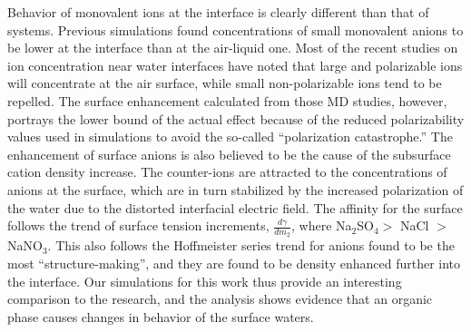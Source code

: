 Behavior of monovalent ions at the \ctcwat interface is clearly different than that of \airwat systems. Previous simulations found concentrations of small monovalent anions to be lower at the \ctcwat interface than at the air-liquid one.\cite{Wick2007a} Most of the recent studies on ion concentration near water interfaces have noted that large and polarizable ions will concentrate at the air surface,\cite{Petersen2005b,Pegram2006,Sloutskin2007,Eggimann2008} while small non-polarizable ions tend to be repelled. The surface enhancement calculated from those MD studies, however, portrays the lower bound of the actual effect because of the reduced polarizability values used in simulations to avoid the so-called ``polarization catastrophe.'' The enhancement of surface anions is also believed to be the cause of the subsurface cation density increase. The counter-ions are attracted to the concentrations of anions at the surface, which are in turn stabilized by the increased polarization of the water due to the distorted interfacial electric field. The affinity for the surface follows the trend of surface tension increments, $\frac{d\gamma}{dm_2}$, where Na$_2$SO$_4 >$ NaCl $>$ NaNO$_3$.\cite{Pegram2006} This also follows the Hoffmeister series trend for anions found to be the most ``structure-making'', and they are found to be density enhanced further into the interface. Our simulations for this work thus provide an interesting comparison to the \airwat research, and the analysis shows evidence that an organic phase causes changes in behavior of the surface waters.


